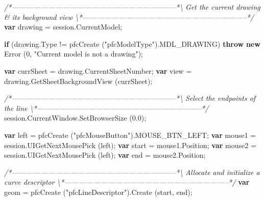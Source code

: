 \documentclass[]{article}
\newenvironment{Shaded}{}{}
\newcommand{\KeywordTok}[1]{\textcolor[rgb]{0.00,0.44,0.13}{\textbf{{#1}}}}
\newcommand{\DecValTok}[1]{\textcolor[rgb]{0.25,0.63,0.44}{{#1}}}
\newcommand{\FloatTok}[1]{\textcolor[rgb]{0.25,0.63,0.44}{{#1}}}
\newcommand{\StringTok}[1]{\textcolor[rgb]{0.25,0.44,0.63}{{#1}}}
\newcommand{\CommentTok}[1]{\textcolor[rgb]{0.38,0.63,0.69}{\textit{{#1}}}}
\newcommand{\OtherTok}[1]{\textcolor[rgb]{0.00,0.44,0.13}{{#1}}}
\newcommand{\FunctionTok}[1]{\textcolor[rgb]{0.02,0.16,0.49}{{#1}}}
\newcommand{\NormalTok}[1]{{#1}}
\begin{document}
\begin{Shaded}
\begin{Highlighting}[]
\CommentTok{/*--------------------------------------------------------------------*\textbackslash{} }
\CommentTok{  Get the current drawing & its background view}
\CommentTok{\textbackslash{}*--------------------------------------------------------------------*/}  
  \KeywordTok{var} \NormalTok{drawing = }\OtherTok{session}\NormalTok{.}\FunctionTok{CurrentModel}\NormalTok{;}
  
  \KeywordTok{if} \NormalTok{(}\OtherTok{drawing}\NormalTok{.}\FunctionTok{Type} \NormalTok{!= }\FunctionTok{pfcCreate} \NormalTok{(}\StringTok{"pfcModelType"}\NormalTok{).}\FunctionTok{MDL_DRAWING}\NormalTok{)}
    \KeywordTok{throw} \KeywordTok{new} \FunctionTok{Error} \NormalTok{(}\DecValTok{0}\NormalTok{, }\StringTok{"Current model is not a drawing"}\NormalTok{);}
  
  \KeywordTok{var} \NormalTok{currSheet = }\OtherTok{drawing}\NormalTok{.}\FunctionTok{CurrentSheetNumber}\NormalTok{;}
  \KeywordTok{var} \NormalTok{view = }\OtherTok{drawing}\NormalTok{.}\FunctionTok{GetSheetBackgroundView} \NormalTok{(currSheet);}
 
\CommentTok{/*--------------------------------------------------------------------*\textbackslash{} }
\CommentTok{   Select the endpoints of the line}
\CommentTok{\textbackslash{}*--------------------------------------------------------------------*/}
  \OtherTok{session}\NormalTok{.}\OtherTok{CurrentWindow}\NormalTok{.}\FunctionTok{SetBrowserSize} \NormalTok{(}\FloatTok{0.0}\NormalTok{);}
  
  \KeywordTok{var} \NormalTok{left = }\FunctionTok{pfcCreate} \NormalTok{(}\StringTok{"pfcMouseButton"}\NormalTok{).}\FunctionTok{MOUSE_BTN_LEFT}\NormalTok{;}
  \KeywordTok{var} \NormalTok{mouse1 = }\OtherTok{session}\NormalTok{.}\FunctionTok{UIGetNextMousePick} \NormalTok{(left);}
  \KeywordTok{var} \NormalTok{start = }\OtherTok{mouse1}\NormalTok{.}\FunctionTok{Position}\NormalTok{;}
  \KeywordTok{var} \NormalTok{mouse2 = }\OtherTok{session}\NormalTok{.}\FunctionTok{UIGetNextMousePick} \NormalTok{(left);}
  \KeywordTok{var} \NormalTok{end = }\OtherTok{mouse2}\NormalTok{.}\FunctionTok{Position}\NormalTok{;}
  
\CommentTok{/*--------------------------------------------------------------------*\textbackslash{} }
\CommentTok{  Allocate and initialize a curve descriptor }
\CommentTok{\textbackslash{}*--------------------------------------------------------------------*/}     
  \KeywordTok{var} \NormalTok{geom = }\FunctionTok{pfcCreate} \NormalTok{(}\StringTok{"pfcLineDescriptor"}\NormalTok{).}\FunctionTok{Create} \NormalTok{(start, end);}
  

\end{Highlighting}
\end{Shaded}
\end{document}
